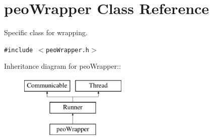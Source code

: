 \hypertarget{classpeoWrapper}{
\section{peo\-Wrapper Class Reference}
\label{classpeoWrapper}
}
Specific class for wrapping.  


{\tt \#include $<$peo\-Wrapper.h$>$}

Inheritance diagram for peo\-Wrapper::\begin{figure}[H]
\begin{center}
\leavevmode
\includegraphics[height=3cm]{classpeoWrapper}
\end{center}
\end{figure}
